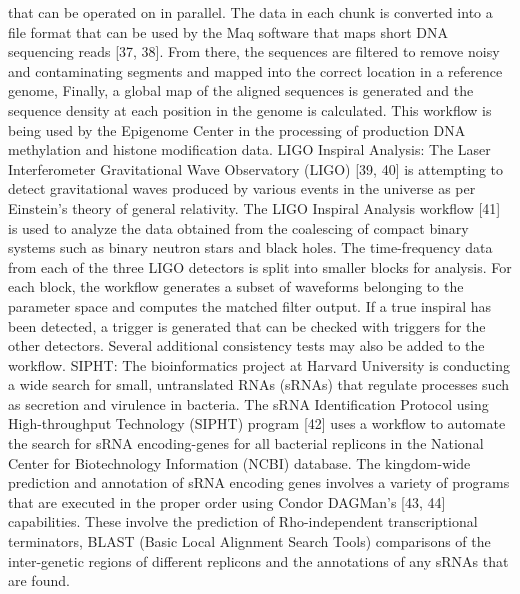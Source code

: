\documentclass[final,5p,times,twocolumn]{elsarticle}
\begin{document}
that can be operated on in parallel. The data in each chunk is converted into a file format that can be used by the 
Maq software that maps short DNA sequencing reads [37, 38]. From there, the sequences are filtered to remove 
noisy and contaminating segments and mapped into the correct location in a reference genome, Finally, a global 
map of the aligned sequences is generated and the sequence density at each position in the genome is calculated. 
This workflow is being used by the Epigenome Center in the processing of production DNA methylation and 
histone modification data.
LIGO Inspiral Analysis: The Laser Interferometer Gravitational Wave Observatory (LIGO) [39, 40] is 
attempting to detect gravitational waves produced by various events in the universe as per Einstein’s theory of 
general relativity. The LIGO Inspiral Analysis workflow [41] is used to analyze the data obtained from the coalescing of compact binary systems such as binary neutron stars and black holes. The time-frequency data from 
each of the three LIGO detectors is split into smaller blocks for analysis. For each block, the workflow generates a 
subset of waveforms belonging to the parameter space and computes the matched filter output. If a true inspiral has 
been detected, a trigger is generated that can be checked with triggers for the other detectors. Several additional 
consistency tests may also be added to the workflow.
SIPHT: The bioinformatics project at Harvard University is conducting a wide search for small, untranslated 
RNAs (sRNAs) that regulate processes such as secretion and virulence in bacteria. The sRNA Identification 
Protocol using High-throughput Technology (SIPHT) program [42] uses a workflow to automate the search for 
sRNA encoding-genes for all bacterial replicons in the National Center for Biotechnology Information (NCBI) 
database. The kingdom-wide prediction and annotation of sRNA encoding genes involves a variety of programs 
that are executed in the proper order using Condor DAGMan’s [43, 44] capabilities. These involve the prediction 
of Rho-independent transcriptional terminators, BLAST (Basic Local Alignment Search Tools) comparisons of the 
inter-genetic regions of different replicons and the annotations of any sRNAs that are found.
\end{document}
